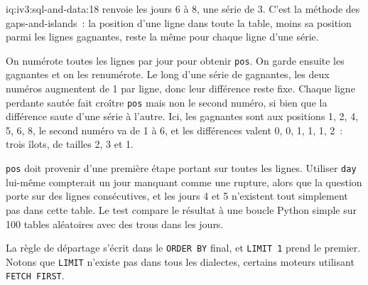 \begin{solution}{iq:iv3:sql-and-data:18}
 renvoie les jours 6 à 8, une série de 3. C'est la méthode des gaps-and-islands~: la position d'une ligne dans toute la table, moins sa position parmi les lignes gagnantes, reste la même pour chaque ligne d'une série.
\label{lst:iv3:sq:islands}

On numérote toutes les lignes par jour pour obtenir \texttt{pos}. On garde ensuite les gagnantes et on les renumérote. Le long d'une série de gagnantes, les deux numéros augmentent de 1 par ligne, donc leur différence reste fixe. Chaque ligne perdante sautée fait croître \texttt{pos} mais non le second numéro, si bien que la différence saute d'une série à l'autre. Ici, les gagnantes sont aux positions 1, 2, 4, 5, 6, 8, le second numéro va de 1 à 6, et les différences valent 0, 0, 1, 1, 1, 2~: trois îlots, de tailles 2, 3 et 1.

\texttt{pos} doit provenir d'une première étape portant sur toutes les lignes. Utiliser \texttt{day} lui-même compterait un jour manquant comme une rupture, alors que la question porte sur des lignes consécutives, et les jours 4 et 5 n'existent tout simplement pas dans cette table. Le test compare le résultat à une boucle Python simple sur 100 tables aléatoires avec des trous dans les jours.

La règle de départage s'écrit dans le \texttt{ORDER BY} final, et \texttt{LIMIT 1} prend le premier. Notons que \texttt{LIMIT} n'existe pas dans tous les dialectes, certains moteurs utilisant \texttt{FETCH FIRST}.

\end{solution}

